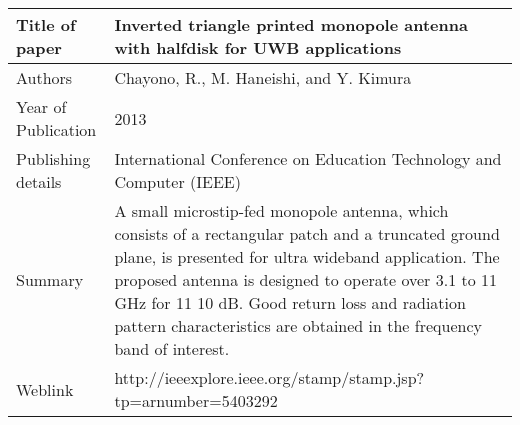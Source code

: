 \documentclass{article}
\begin{document}
\begin{table}
  \centering
	\begin{tabular}{ |l|p{11cm}| }
			\hline
		     Title of paper &  Inverted triangle printed monopole antenna with halfdisk for UWB applications \\
		     \hline
			 Authors & Chayono, R., M. Haneishi, and Y. Kimura \\
			\hline
			 Year of Publication & 2013 \\
			\hline
			 Publishing details & International Conference on Education Technology and Computer (IEEE) \\ \hline
			 Summary & A small microstip-fed monopole antenna, which consists of a rectangular patch and a truncated ground plane, is presented for ultra wideband application. The proposed antenna is designed to operate over 3.1 to 11 GHz for 11 10 dB. Good return loss and radiation pattern characteristics are obtained in the frequency band of interest.\\
			\hline
			 Weblink & http://ieeexplore.ieee.org/stamp/stamp.jsp?tp=arnumber=5403292 \\
			 \hline			 
	\end{tabular}		

\end{table}
\end{document}
